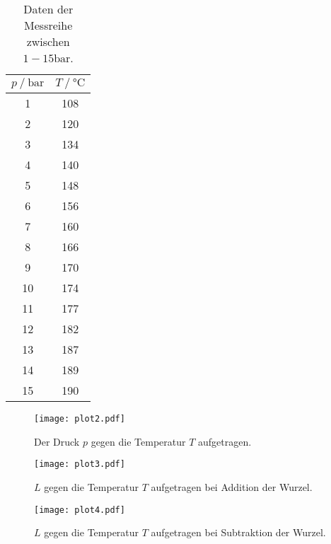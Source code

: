 \begin{table}[H]
  \centering
  \caption{Daten der Messreihe zwischen $1-15\unit{\bar}$.}
  \begin{tabular}{cc}
    \toprule
    {$p \mathbin{/} \unit{\bar}$} &
    {$T \mathbin{/} \unit{\celsius}$} \\
    \midrule
      1 & 108 \\
      2 & 120 \\
      3 & 134 \\
      4 & 140 \\
      5 & 148 \\
      6 & 156 \\
      7 & 160 \\
      8 & 166 \\
      9 & 170 \\
      10 & 174 \\
      11 & 177 \\
      12 & 182 \\
      13 & 187 \\
      14 & 189 \\
      15 & 190 \\
    \bottomrule
  \end{tabular}
  \label{tab:Tabelle2}
\end{table}
\begin{figure}[H]
  \centering
  \texttt{[image: plot2.pdf]}
  \caption{Der Druck $p$ gegen die Temperatur $T$ aufgetragen.}
  \label{fig:M1-15}
\end{figure}
\begin{figure}[H]
  \centering
  \texttt{[image: plot3.pdf]}
  \caption{$L$ gegen die Temperatur $T$ aufgetragen bei Addition der Wurzel.}
  \label{fig:LAdd}
\end{figure}
\begin{figure}[H]
  \centering
  \texttt{[image: plot4.pdf]}
  \caption{$L$ gegen die Temperatur $T$ aufgetragen bei Subtraktion der Wurzel.}
  \label{fig:LSub}
\end{figure}
